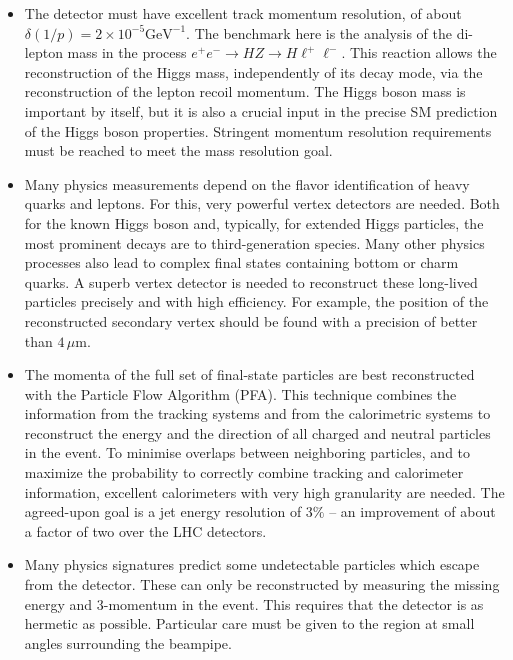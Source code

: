 \documentclass[%
 reprint,
 floatfix,
 amsmath,amssymb,
 aps,
]{revtex4-1}
\def\ee{e^+e^-}
\begin{document}
 
\begin{itemize}
 \item The detector must have excellent track momentum
   resolution, of about $\delta(1/p)=2 \times 10^{-5} \mathrm{GeV}^{-1}$. 
The benchmark  here is the analysis 
of the di-lepton mass in the process $\ee \to HZ \to H \ell^+
\ell^-$. This reaction allows the reconstruction of the 
Higgs mass,  independently of its decay mode,  via the 
reconstruction of the lepton recoil momentum. The Higgs boson mass is
important by itself, but it is also a crucial input in the precise SM
prediction of the Higgs boson properties.  Stringent momentum resolution requirements must be reached
to meet the mass resolution goal. 
\item Many physics measurements depend on the flavor  identification of heavy
  quarks
and leptons.  For this, very powerful vertex detectors 
are needed. Both for the known Higgs boson and, typically, for 
extended Higgs particles, the most prominent decays are to
third-generation
species.   Many other physics processes also lead to 
complex  final states containing  bottom or charm quarks.
A superb  vertex detector  is needed to reconstruct these 
long-lived particles 
precisely and with high efficiency.
 For example, the position of the reconstructed secondary
 vertex
 should be found with a precision of better than $4\,\mu$m.
\item The momenta of the full set of final-state particles are
 best reconstructed with the 
Particle Flow Algorithm (PFA).
 This  technique combines 
the information from the tracking systems and from the 
calorimetric systems to reconstruct the 
energy and the direction of all charged and 
neutral particles in the event. To minimise overlaps between 
neighboring particles, and to 
maximize the probability to 
correctly combine tracking and calorimeter information, 
excellent calorimeters with very high granularity  are needed.
The agreed-upon goal is  a jet energy resolution of $3 \%$ -- an
improvement of about a 
factor of two over the LHC detectors. 
\item Many physics signatures predict some undetectable particles
which escape from the detector. These  can only be reconstructed by 
measuring the missing energy and 3-momentum  in the event. This requires 
that the detector is as hermetic as possible. 
Particular care must be given to the region at small angles surrounding the 
beampipe. %
\end{itemize}
\end{document}
